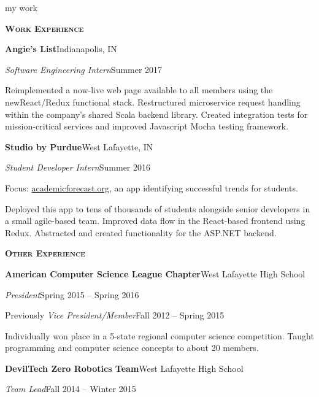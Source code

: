 \documentclass[11pt]{article}
\newcommand{\sectionfont}{\Large\scshape\bfseries\color{cg505green}}
\newcommand{\impact}[1]{\textcolor{cg505green}{\nohyphens{#1}}}
\begin{document}
\begin{minipage}[t]{0.67\textwidth}
  {\Huge\color{black} my work \phantom{me}}

  \vspace{5pt}

  {\sectionfont Work Experience}

  \textbf{Angie's List}\hfill Indianapolis, IN
  \begin{adjustwidth}{10pt}{}
    \emph{Software Engineering Intern}\hfill Summer 2017

    Reimplemented a \impact{now-live web page} available to all members using the new\break React/Redux functional stack.
    Restructured \impact{microservice request handling} within the company's shared Scala backend library.
    Created integration tests for mission-critical services and improved Javascript Mocha testing framework.
  \end{adjustwidth}

  \textbf{Studio by Purdue}\hfill West Lafayette, IN
  \begin{adjustwidth}{10pt}{}
    \emph{Student Developer Intern}\hfill Summer 2016

    Focus: \href{https://academicforecast.org/about/}{academicforecast.org}, an app identifying successful trends for students.

    \impact{Deployed this app to tens of thousands} of students alongside senior developers in a small agile-based team.
    Improved data flow in the React-based frontend using Redux.
    Abstracted and created functionality for the ASP.NET backend.
  \end{adjustwidth}

  \vspace{5pt}

  {\sectionfont Other Experience}

  \textbf{American Computer Science League Chapter}\hfill West Lafayette High School
  \begin{adjustwidth}{10pt}{}
    \emph{President}\hfill Spring 2015 -- Spring 2016

    Previously \emph{Vice President/Member}\hfill Fall 2012 -- Spring 2015

    Individually \impact{won  place} in a 5-state regional computer science competition.
    Taught programming and computer science concepts to about 20 members.
  \end{adjustwidth}

  \textbf{DevilTech Zero Robotics Team}\hfill West Lafayette High School
  \begin{adjustwidth}{10pt}{}
    \emph{Team Lead}\hfill Fall 2014 -- Winter 2015


\end{adjustwidth}
\end{minipage}
\end{document}
